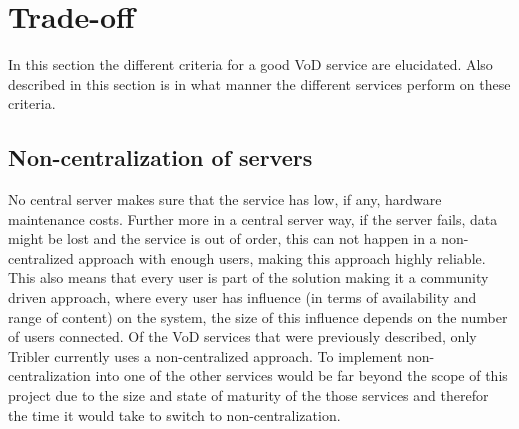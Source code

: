 \section{Trade-off}
In this section the different criteria for a good VoD service are elucidated. Also described in this section is in what manner the different services perform on these criteria.

\subsection{Non-centralization of servers}
No central server makes sure that the service has low, if any, hardware maintenance costs. Further more in a central server way, if the server fails, data might be lost and the service is out of order, this can not happen in a non-centralized approach with enough users, making this approach highly reliable. This also means that every user is part of the solution making it a community driven approach, where every user has influence (in terms of availability and range of content) on the system, the size of this influence depends on the number of users connected.
Of the VoD services that were previously described, only Tribler currently uses a non-centralized approach. To implement non-centralization into one of the other services would be far beyond the scope of this project due to the size and state of maturity of the those services and therefor the time it would take to switch to non-centralization. 
